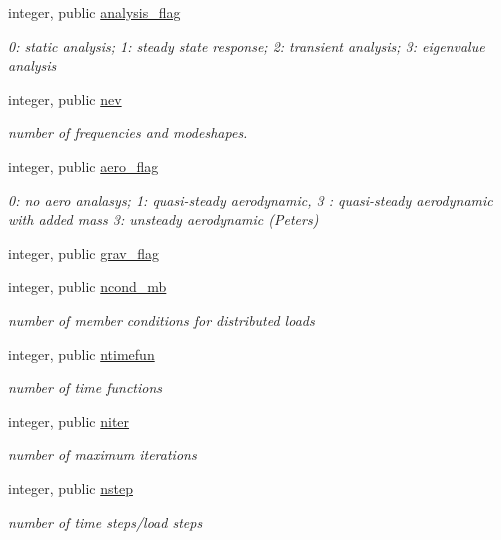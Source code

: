 \begin{DoxyCompactItemize}
integer, public \hyperlink{namespaceioaero_a435527b09d62e7aac9883e1a6d6f3438}{analysis\+\_\+flag}
\begin{DoxyCompactList}\small\item\em 0\+: static analysis; 1\+: steady state response; 2\+: transient analysis; 3\+: eigenvalue analysis \end{DoxyCompactList}\item 
integer, public \hyperlink{namespaceioaero_a1216c8699aea9eb27e3d795cc9d8d271}{nev}
\begin{DoxyCompactList}\small\item\em number of frequencies and modeshapes. \end{DoxyCompactList}\item 
integer, public \hyperlink{namespaceioaero_afb280b6ca8de323c9a07076df81a71e1}{aero\+\_\+flag}
\begin{DoxyCompactList}\small\item\em 0\+: no aero analasys; 1\+: quasi-\/steady aerodynamic, 3 \+: quasi-\/steady aerodynamic with added mass 3\+: unsteady aerodynamic (Peters) \end{DoxyCompactList}\item 
integer, public \hyperlink{namespaceioaero_a831fe87d45ef05e3e29a8c4c2fc88c8f}{grav\+\_\+flag}
\item 
integer, public \hyperlink{namespaceioaero_ab9193f4ff70a22ae5858118fc653f22b}{ncond\+\_\+mb}
\begin{DoxyCompactList}\small\item\em number of member conditions for distributed loads \end{DoxyCompactList}\item 
integer, public \hyperlink{namespaceioaero_a8d0cfe1f4a5677d76ba3f3e775b12d1e}{ntimefun}
\begin{DoxyCompactList}\small\item\em number of time functions \end{DoxyCompactList}\item 
integer, public \hyperlink{namespaceioaero_ac008486fd12e0029a1ef77b3ca5e12c3}{niter}
\begin{DoxyCompactList}\small\item\em number of maximum iterations \end{DoxyCompactList}\item 
integer, public \hyperlink{namespaceioaero_ab078a397454a22b07a19ae3a7443a561}{nstep}
\begin{DoxyCompactList}\small\item\em number of time steps/load steps \end{DoxyCompactList}\item 

\end{DoxyCompactItemize}
